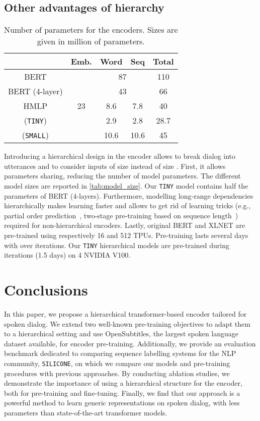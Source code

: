 \documentclass[11pt,a4paper]{article}
\begin{document}
\subsection{Other advantages of hierarchy}
\begin{table}
\begin{center}
\begin{tabular}{ c |c c c c} 
 \hline
 & Emb. & Word &Seq & Total  \\ \hline
  
    BERT & \multirow{5}{*}{23}  & \multicolumn{2}{c}{87}  & 110 \\
        BERT (4-layer) &  & \multicolumn{2}{c}{43}  & 66 \\
    HMLP &   &8.6 & 7.8  & 40  \\
    (\texttt{TINY}) &   &2.9 & 2.8 & 28.7 \\
     (\texttt{SMALL}) &   &10.6 & 10.6 & 45  \\
\end{tabular}
\caption{Number of parameters for the encoders. Sizes are given in million of parameters.}
\label{tab:model_size}
\end{center}
\end{table}
Introducing a hierarchical design in the encoder allows to break dialog into utterances and to consider inputs of size  instead of size . First, it allows parameters sharing, reducing the number of model parameters. The different model sizes are reported in \autoref{tab:model_size}.
Our \texttt{TINY} model contains half the parameters of BERT (4-layers). Furthermore, modelling long-range dependencies hierarchically makes learning faster and allows to get rid of learning tricks (e.g., partial order prediction~\cite{xlnet}, two-stage pre-training based on sequence length~\cite{bert}) required for non-hierarchical encoders.
Lastly, original BERT and XLNET are pre-trained using respectively 16 and 512 TPUs. Pre-training lasts several days with over  iterations. Our \texttt{TINY} hierarchical models are pre-trained during  iterations (1.5 days) on 4 NVIDIA V100. \section{Conclusions}
In this paper, we propose a hierarchical transformer-based encoder tailored for spoken dialog. We extend two well-known pre-training objectives to adapt them to a hierarchical setting and use OpenSubtitles, the largest spoken language dataset available, for encoder pre-training. Additionally, we provide an evaluation benchmark dedicated to comparing sequence labelling systems for the NLP community, \texttt{SILICONE}, on which we compare our models and pre-training procedures with previous approaches.
By conducting ablation studies, we demonstrate the importance of using a hierarchical structure for the encoder, both for pre-training and fine-tuning.
Finally, we find that our approach is a powerful method to learn generic representations on spoken dialog, with less parameters than state-of-the-art transformer models. 
\end{document}
